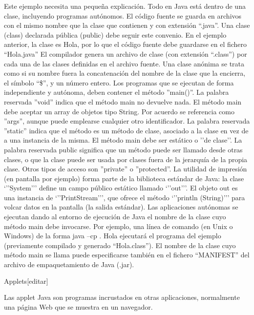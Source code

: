 \documentclass[11pt,a4paper]{$type}
\begin{document}
	\bigskip
							Este ejemplo necesita una pequeña explicación.
	\bigskip
							Todo en Java está dentro de una clase, incluyendo programas autónomos.
	\bigskip
							El código fuente se guarda en archivos con el mismo nombre que la clase que contienen y con extensión “.java”. Una clase (class) declarada pública (public) debe seguir este convenio. En el ejemplo anterior, la clase es Hola, por lo que el código fuente debe guardarse en el fichero “Hola.java”
	\bigskip
							El compilador genera un archivo de clase (con extensión “.class”) por cada una de las clases definidas en el archivo fuente. Una clase anónima se trata como si su nombre fuera la concatenación del nombre de la clase que la encierra, el símbolo “\$”, y un número entero.
	\bigskip
							Los programas que se ejecutan de forma independiente y autónoma, deben contener el método ”main()”.
	\bigskip
							La palabra reservada ”void” indica que el método main no devuelve nada.
	\bigskip
							El método main debe aceptar un array de objetos tipo String. Por acuerdo se referencia como ”args”, aunque puede emplearse cualquier otro identificador.
	\bigskip
							La palabra reservada ”static” indica que el método es un método de clase, asociado a la clase en vez de a una instancia de la misma. El método main debe ser estático o ’’de clase’’.
	\bigskip
							La palabra reservada public significa que un método puede ser llamado desde otras clases, o que la clase puede ser usada por clases fuera de la jerarquía de la propia clase. Otros tipos de acceso son ”private” o ”protected”.
	\bigskip
							La utilidad de impresión (en pantalla por ejemplo) forma parte de la biblioteca estándar de Java: la clase ‘’’System’’’ define un campo público estático llamado ‘’’out’’’. El objeto out es una instancia de ‘’’PrintStream’’’, que ofrece el método ‘’’println (String)’’’ para volcar datos en la pantalla (la salida estándar).
	\bigskip
							Las aplicaciones autónomas se ejecutan dando al entorno de ejecución de Java el nombre de la clase cuyo método main debe invocarse. Por ejemplo, una línea de comando (en Unix o Windows) de la forma java –cp . Hola ejecutará el programa del ejemplo (previamente compilado y generado “Hola.class”). El nombre de la clase cuyo método main se llama puede especificarse también en el fichero “MANIFEST” del archivo de empaquetamiento de Java (.jar).
	\bigskip
							
	\bigskip
							Applets[editar]
	\bigskip
							
	\bigskip
							Las applet Java son programas incrustados en otras aplicaciones, normalmente una página Web que se muestra en un navegador.
	\bigskip
							
\end{document}
